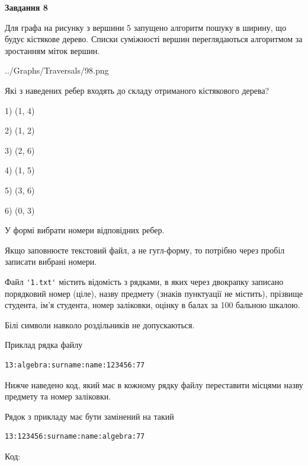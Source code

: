 \documentclass[12pt, ukrainian]{article}
\def\code#1{\Verb!#1!}
\begin{document}
{\begin {large}
{\begin {center}\textbf{Завдання 8}\end {center}}\par
Для графа на рисунку з вершини 5 запущено алгоритм пошуку в ширину, що будує кістякове дерево. Списки суміжності вершин переглядаються алгоритмом за зростанням міток вершин.\par
\begin{center}
	{../Graphs/Traversals/98.png}
\end{center}
\par Які з наведених ребер входять до складу отриманого кістякового дерева?\par
1) (1, 4)\par
2) (1, 2)\par
3) (2, 6)\par
4) (1, 5)\par
5) (3, 6)\par
6) (0, 3)\par
{\vskip 15pt} У формі вибрати номери відповідних ребер.


Якщо заповнюєте текстовий файл, а не гугл-форму, то потрібно через пробіл записа\-ти вибрані номери.\par
\newpage


Файл \code{'1.txt'} містить відомість з рядками, в яких через двокрапку записано поряд\-ковий номер (ціле), назву предмету (знаків пунктуації не містить), прізвище студента, ім'я студента, номер заліковки, оцінку в балах за 100 бальною шкалою.

Білі символи навколо роздільників не допускаються.

Приклад рядка файлу



\begin{verbatim}
13:algebra:surname:name:123456:77
\end{verbatim}


Нижче наведено код, який має в кожному рядку файлу переставити місцями назву предмету та номер заліковки.

Рядок з прикладу має бути замінений на такий



\begin{verbatim}
13:123456:surname:name:algebra:77
\end{verbatim}




Код:




\end{large}}
\end{document}
